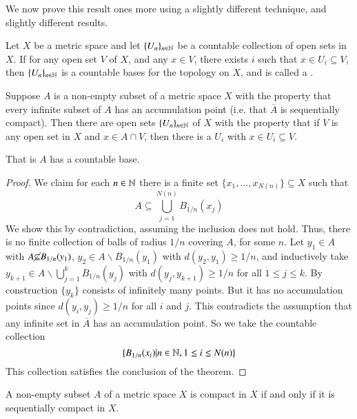 We now prove this result ones more using a slightly different technique, and slightly different results. 

\begin{defn}
    Let $X$ be a metric space and let $\{U_n\}_{n \in \mathbb N}$ be a countable collection of open sets in $X$. If for any open set $V$ of $X$, and any $x \in V$, there exists $i$ such that $x \in U_i \subseteq V$, then $\{U_n\}_{n\in\mathbb N}$ is a countable bases for the topology on $X$, and is called a .
\end{defn}

\begin{lem}
    Suppose $A$ is a non-empty subset of a metric space $X$ with the property that every infinite subset of $A$ has an accumulation point (i.e. that $\overline{A}$ is sequentially compact). Then there are open sets $\{U_n\}_{n \in \mathbb N}$ of $X$ with the property that if $V$ is any open set in $X$ and $x \in A \cap V$, then there is a $U_i$ with $x \in U_i \subseteq V$.
\end{lem}
That is $A$ has a countable base.
\begin{proof}
    We claim for each $n \in \mathbb N$ there is a finite set $\{x_1,...,x_{N(n)}\}\subseteq X$ such that $$A \subseteq \bigcup_{j=1}^{N(n)}B_{1/n}(x_j)$$ We show this by contradiction, assuming the inclusion does not hold. Thus, there is no finite collection of balls of radius $1/n$ covering $A$, for some $n$. Let $y_1 \in A$ with $A \cancel{\subseteq}B_{1/n}(y_1)$, $y_2 \in A\backslash B_{1/n}(y_1)$ with $d(y_2,y_1) \geq 1/n$, and inductively take $y_{k+1} \in A\backslash\bigcup_{j=1}^kB_{1/n}(y_j)$ with $d(y_j,y_{k+1}) \geq 1/n$ for all $1 \leq j \leq k$. By construction $\{y_k\}$ consists of infinitely many points. But it has no accumulation points since $d(y_i,y_j) \geq 1/n$ for all $i$ and $j$. This contradicts the assumption that any infinite set in $\overline{A}$ has an accumulation point. So we take the countable collection $$\{B_{1/n}(x_i)\vert n \in \mathbb N,1 \leq i \leq N(n)\}$$ This collection satisfies the conclusion of the theorem.
\end{proof}

\begin{thm}
    A non-empty subset $A$ of a metric space $X$ is compact in $X$ if and only if it is sequentially compact in $X$.
\end{thm}

